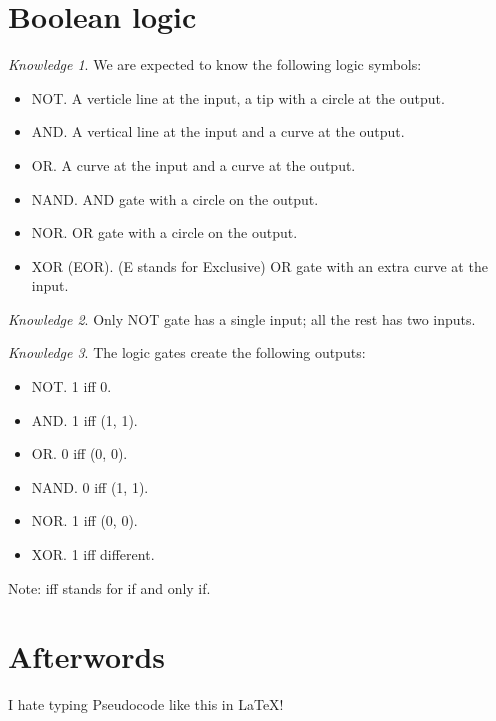\documentclass[8pt]{article}
\theoremstyle{remark}
\newtheorem{knowledge}{Knowledge}[subsection]
\begin{document}
    \section{Boolean logic}
        \begin{knowledge}
            We are expected to know the following logic symbols:
            \begin{itemize}
                \item NOT. A verticle line at the input, a tip with a circle at the output.
                \item AND. A vertical line at the input and a curve at the output.
                \item OR. A curve at the input and a curve at the output.
                \item NAND. AND gate with a circle on the output.
                \item NOR. OR gate with a circle on the output.
                \item XOR (EOR). (E stands for Exclusive) OR gate with an extra curve at the input.
            \end{itemize}
        \end{knowledge}

        \begin{knowledge}
            Only NOT gate has a single input; all the rest has two inputs.
        \end{knowledge}

        \begin{knowledge}
            The logic gates create the following outputs:
            \begin{itemize}
                \item NOT. 1 iff 0.
                \item AND. 1 iff (1, 1).
                \item OR. 0 iff (0, 0).
                \item NAND. 0 iff (1, 1).
                \item NOR. 1 iff (0, 0).
                \item XOR. 1 iff different.
            \end{itemize}
            Note: iff stands for if and only if.
        \end{knowledge}

    \section*{Afterwords}
        I hate typing Pseudocode like this in \LaTeX!
\end{document}
